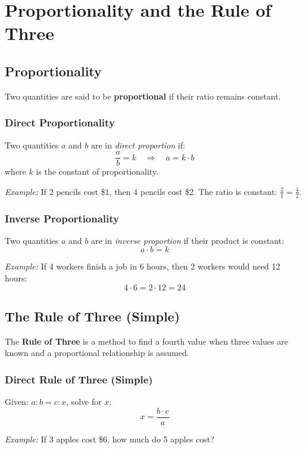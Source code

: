 \section{Proportionality and the Rule of Three}

\subsection{Proportionality}

Two quantities are said to be \textbf{proportional} if their ratio remains constant.

\subsubsection*{Direct Proportionality}

Two quantities $a$ and $b$ are in \textit{direct proportion} if:
\[
\frac{a}{b} = k \quad \Rightarrow \quad a = k \cdot b
\]
where $k$ is the constant of proportionality.

\textit{Example:} If 2 pencils cost \$1, then 4 pencils cost \$2. The ratio is constant: $\frac{2}{1} = \frac{4}{2}$.

\subsubsection*{Inverse Proportionality}

Two quantities $a$ and $b$ are in \textit{inverse proportion} if their product is constant:
\[
a \cdot b = k
\]

\textit{Example:} If 4 workers finish a job in 6 hours, then 2 workers would need 12 hours:
\[
4 \cdot 6 = 2 \cdot 12 = 24
\]

\subsection{The Rule of Three (Simple)}

The \textbf{Rule of Three} is a method to find a fourth value when three values are known and a proportional relationship is assumed.

\subsubsection*{Direct Rule of Three (Simple)}

Given: $a : b = c : x$, solve for $x$:
\[
x = \frac{b \cdot c}{a}
\]

\textit{Example:} If 3 apples cost \$6, how much do 5 apples cost?

